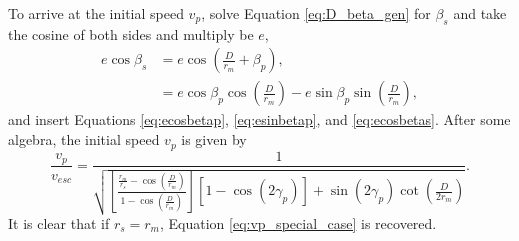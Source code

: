 \documentclass{article}
\begin{document}
To arrive at the initial speed $v_p$, solve Equation \eqref{eq:D_beta_gen} for $\beta_s$ and take the cosine of both sides and multiply be $e$,
\begin{align}
e\cos\beta_s &= e\cos\left(\frac{D}{r_m}+\beta_p\right),\nonumber\\
&= e\cos\beta_p\cos\left(\frac{D}{r_m}\right) - e\sin\beta_p\sin\left(\frac{D}{r_m}\right),\nonumber
\end{align}
and insert Equations \eqref{eq:ecosbetap}, \eqref{eq:esinbetap}, and \eqref{eq:ecosbetas}. After some algebra, the initial speed $v_p$ is given by
\begin{equation}\label{eq:vp_gen_case}
\frac{v_p}{v_{esc}} = \frac{1}{\sqrt{\left[\frac{\frac{r_m}{r_s}-\cos\left(\frac{D}{r_m}\right)}{1-\cos\left(\frac{D}{r_m}\right)}\right]\left[1-\cos(2\gamma_p)\right] + \sin(2\gamma_p)\cot\left(\frac{D}{2r_m}\right)}}.
\end{equation}
It is clear that if $r_s=r_m$, Equation \eqref{eq:vp_special_case} is recovered.
\end{document}
